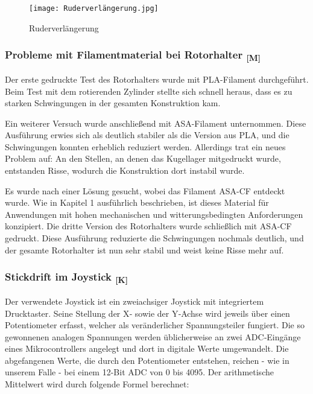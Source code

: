 \documentclass[a4paper,12pt]{article}
\begin{document}
\begin{figure}[H]
    \centering
    \texttt{[image: Ruderverlängerung.jpg]}
    \caption{Ruderverlängerung}
    \label{fig:Ruderverlängerung}
\end{figure}

\subsubsection{\texorpdfstring{Probleme mit Filamentmaterial bei Rotorhalter \textsubscript{[M]}}{Probleme mit Filamentmaterial bei Rotorhalter [M]}}

Der erste gedruckte Test des Rotorhalters wurde mit PLA-Filament durchgeführt. Beim Test mit dem rotierenden Zylinder stellte sich schnell heraus, dass es zu starken Schwingungen in der gesamten Konstruktion kam.\newline

Ein weiterer Versuch wurde anschließend mit ASA-Filament unternommen. Diese Ausführung erwies sich als deutlich stabiler als die Version aus PLA, und die Schwingungen konnten erheblich reduziert werden. Allerdings trat ein neues Problem auf: An den Stellen, an denen das Kugellager mitgedruckt wurde, entstanden Risse, wodurch die Konstruktion dort instabil wurde.\newline

Es wurde nach einer Lösung gesucht, wobei das Filament ASA-CF entdeckt wurde. Wie in Kapitel 1 ausführlich beschrieben, ist dieses Material für Anwendungen mit hohen mechanischen und witterungsbedingten Anforderungen konzipiert. Die dritte Version des Rotorhalters wurde schließlich mit ASA-CF gedruckt. Diese Ausführung reduzierte die Schwingungen nochmals deutlich, und der gesamte Rotorhalter ist nun sehr stabil und weist keine Risse mehr auf.




\subsubsection{\texorpdfstring{Stickdrift im Joystick \textsubscript{[K]}}{Stickdrift im Joystick [K]}}

Der verwendete Joystick ist ein zweiachsiger Joystick mit integriertem Drucktaster. Seine Stellung der X‑ sowie der Y‑Achse wird jeweils über einen Potentiometer erfasst, welcher als veränderlicher Spannungsteiler fungiert. Die so gewonnenen analogen Spannungen werden üblicherweise an zwei ADC‑Eingänge eines Mikrocontrollers angelegt und dort in digitale Werte umgewandelt. Die abgefangenen Werte, die durch den Potentiometer entstehen, reichen - wie in unserem Falle - bei einem 12-Bit ADC von 0 bis 4095. Der arithmetische Mittelwert wird durch folgende Formel berechnet: 
\end{document}
